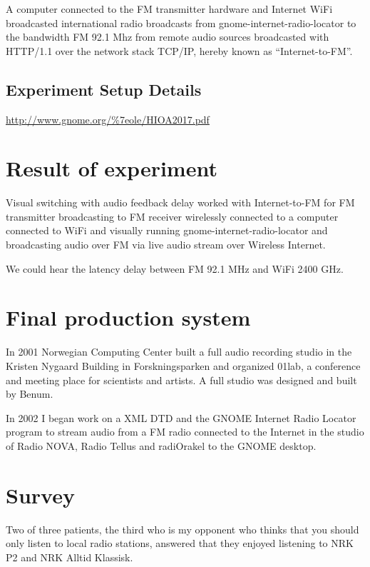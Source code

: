 \documentclass[a4paper,norsk,utf8]{report}
\begin{document}
    A computer connected to the FM transmitter hardware and Internet
    WiFi broadcasted international radio broadcasts from
    gnome-internet-radio-locator to the bandwidth FM 92.1 Mhz from
    remote audio sources broadcasted with HTTP/1.1 over the network
    stack TCP/IP, hereby known as ``Internet-to-FM''.

\section{Experiment Setup Details}

\url{http://www.gnome.org/%7eole/HIOA2017.pdf}

\chapter{Result of experiment}

    Visual switching with audio feedback delay worked with
    Internet-to-FM for FM transmitter broadcasting to FM receiver
    wirelessly connected to a computer connected to WiFi and visually
    running gnome-internet-radio-locator and broadcasting audio over
    FM via live audio stream over Wireless Internet.

    We could hear the latency delay between FM 92.1 MHz and WiFi 2400 GHz.

\chapter{Final production system}

    In 2001 Norwegian Computing Center built a full audio recording
    studio in the Kristen Nygaard Building in Forskningsparken and
    organized 01lab, a conference and meeting place for scientists and
    artists.  A full studio was designed and built by Benum.

    In 2002 I began work on a XML DTD and the GNOME Internet Radio
    Locator program to stream audio from a FM radio connected to the
    Internet in the studio of Radio NOVA, Radio Tellus and radiOrakel
    to the GNOME desktop.

\chapter{Survey}

    Two of three patients, the third who is my opponent who thinks
    that you should only listen to local radio stations, answered that
    they enjoyed listening to NRK P2 and NRK Alltid Klassisk.
\end{document}
